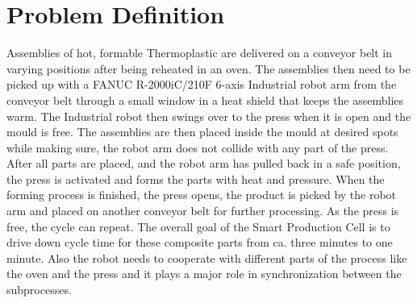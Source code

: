 
\chapter{Problem Definition}

Assemblies of hot, formable Thermoplastic are delivered on a conveyor belt in varying positions after being reheated in an oven. 
The assemblies then need to be picked up with a FANUC R-2000iC/210F 6-axis Industrial robot arm from the conveyor belt through a small window in a heat shield that keeps the assemblies warm. 
The Industrial robot then swings over to the press when it is open and the mould is free. 
The assemblies are then placed inside the mould at desired spots while making sure, the robot arm does not collide with any part of the press. 
After all parts are placed, and the robot arm has pulled back in a safe position, the press is activated and forms the parts with heat and pressure. 
When the forming process is finished, the press opens, the product is picked by the robot arm and placed on another conveyor belt for further processing. 
As the press is free, the cycle can repeat.
\cite{SystemRequirements}
The overall goal of the Smart Production Cell is to drive down cycle time for these composite parts from ca. three minutes to one minute. 
Also the robot needs to cooperate with different parts of the process like the oven and the press and it plays a major role in synchronization between the subprocesses.
